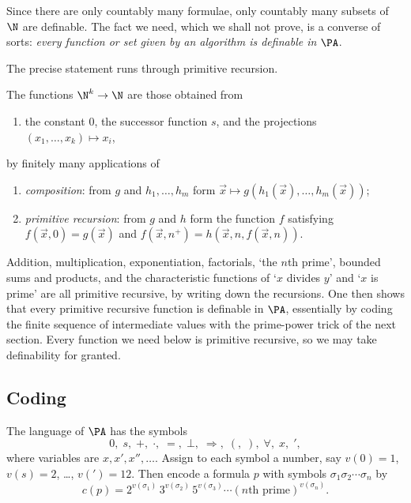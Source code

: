 Since there are only countably many formulae, only countably many subsets of $\N$ are definable. The fact we need, which we shall not prove, is a converse of sorts: \emph{every function or set given by an algorithm is definable in $\PA$}.

The precise statement runs through primitive recursion.

\begin{definition}
  The  functions $\N^k \to \N$ are those obtained from
  \begin{enumerate}[label=(\roman*)]
    \item the constant $0$, the successor function $s$, and the projections $(x_1, \dots, x_k) \mapsto x_i$,
  \end{enumerate}
  by finitely many applications of
  \begin{enumerate}[label=(\roman*), start=2]
    \item \emph{composition}: from $g$ and $h_1, \dots, h_m$ form $\vec x \mapsto g(h_1(\vec x), \dots, h_m(\vec x))$;
    \item \emph{primitive recursion}: from $g$ and $h$ form the function $f$ satisfying $f(\vec x, 0) = g(\vec x)$ and $f(\vec x, n^+) = h(\vec x, n, f(\vec x, n))$.
  \end{enumerate}
\end{definition}

Addition, multiplication, exponentiation, factorials, `the $n$th prime', bounded sums and products, and the characteristic functions of `$x$ divides $y$' and `$x$ is prime' are all primitive recursive, by writing down the recursions. One then shows that every primitive recursive function is definable in $\PA$, essentially by coding the finite sequence of intermediate values with the prime-power trick of the next section. Every function we need below is primitive recursive, so we may take definability for granted.

\subsection{Coding}

The language of $\PA$ has the symbols
$$0, \; s, \; +, \; \cdot, \; =, \; \bot, \; \Rightarrow, \; (, \; ), \; \forall, \; x, \; {}',$$
where variables are $x, x', x'', \dots$. Assign to each symbol a number, say $v(0) = 1$, $v(s) = 2$, \dots, $v(') = 12$. Then encode a formula $p$ with symbols $\sigma_1 \sigma_2 \cdots \sigma_n$ by
$$c(p) = 2^{v(\sigma_1)} \, 3^{v(\sigma_2)} \, 5^{v(\sigma_3)} \cdots (n\text{th prime})^{v(\sigma_n)}.$$

